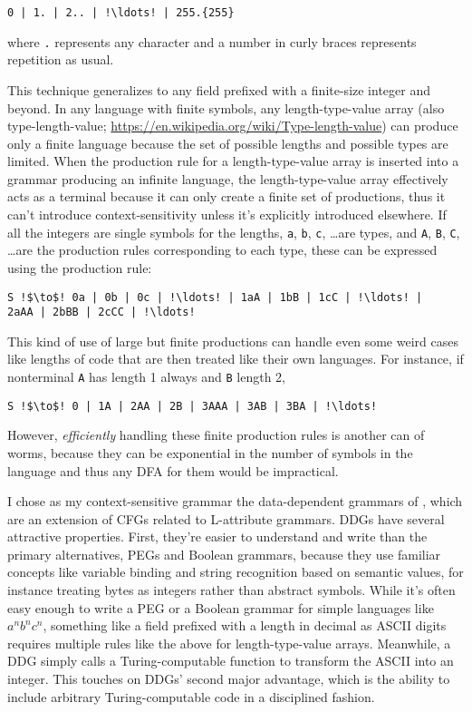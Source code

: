 \documentclass[12pt]{article}
\begin{document}
\begin{lstlisting}
0 | 1. | 2.. | !\ldots! | 255.{255}
\end{lstlisting}

where \texttt{.} represents any character and a number in curly braces
represents repetition as usual.  

This technique generalizes to any field prefixed with a finite-size
integer and beyond.  In any language with finite symbols, any
length-type-value array (also type-length-value;
\url{https://en.wikipedia.org/wiki/Type-length-value}) can produce
only a finite language because the set of possible lengths and
possible types are limited.  When the production rule for a
length-type-value array is inserted into a grammar producing an
infinite language, the length-type-value array effectively acts as a
terminal because it can only create a finite set of productions, thus
it can't introduce context-sensitivity unless it's explicitly
introduced elsewhere.  If all the integers are single symbols for the
lengths, \texttt{a}, \texttt{b}, \texttt{c}, \ldots are types, and
\texttt{A}, \texttt{B}, \texttt{C}, \ldots are the production rules
corresponding to each type, these can be expressed using the
production rule:

\begin{lstlisting}
S !$\to$! 0a | 0b | 0c | !\ldots! | 1aA | 1bB | 1cC | !\ldots! |
2aAA | 2bBB | 2cCC | !\ldots!
\end{lstlisting}

This kind of use of large but finite productions can handle even some
weird cases like lengths of code that are then treated like their own
languages.  For instance, if nonterminal \texttt{A} has length 1
always and \texttt{B} length 2,

\begin{lstlisting}
S !$\to$! 0 | 1A | 2AA | 2B | 3AAA | 3AB | 3BA | !\ldots!
\end{lstlisting}

However, \emph{efficiently} handling these finite production rules is
another can of worms, because they can be exponential in the number of
symbols in the language and thus any DFA for them would be
impractical.

I chose as my context-sensitive grammar the data-dependent grammars of
\textcite{yakker1}, which are an extension of CFGs related to
L-attribute grammars.  DDGs have several attractive properties.
First, they're easier to understand and write than the primary
alternatives, PEGs and Boolean grammars, because they use familiar
concepts like variable binding and string recognition based on
semantic values, for instance treating bytes as integers rather than
abstract symbols.  While it's often easy enough to write a PEG or a
Boolean grammar for simple languages like $a^nb^nc^n$, something like
a field prefixed with a length in decimal as ASCII digits requires
multiple rules like the above for length-type-value arrays.
Meanwhile, a DDG simply calls a Turing-computable function to
transform the ASCII into an integer.  This touches on DDGs' second
major advantage, which is the ability to include arbitrary
Turing-computable code in a disciplined fashion.
\end{document}
